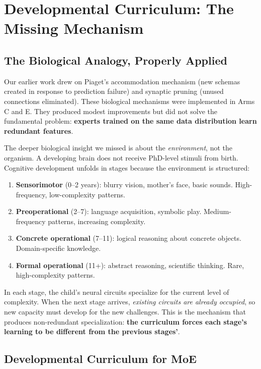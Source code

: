\documentclass{article}
\begin{document}
\section{Developmental Curriculum: The Missing Mechanism}

\subsection{The Biological Analogy, Properly Applied}

Our earlier work drew on Piaget's accommodation mechanism (new schemas created in response to prediction failure) and synaptic pruning (unused connections eliminated). These biological mechanisms were implemented in Arms C and E. They produced modest improvements but did not solve the fundamental problem: \textbf{experts trained on the same data distribution learn redundant features}.

The deeper biological insight we missed is about the \emph{environment}, not the organism. A developing brain does not receive PhD-level stimuli from birth. Cognitive development unfolds in stages because the environment is structured:

\begin{enumerate}
    \item \textbf{Sensorimotor} (0--2 years): blurry vision, mother's face, basic sounds. High-frequency, low-complexity patterns.
    \item \textbf{Preoperational} (2--7): language acquisition, symbolic play. Medium-frequency patterns, increasing complexity.
    \item \textbf{Concrete operational} (7--11): logical reasoning about concrete objects. Domain-specific knowledge.
    \item \textbf{Formal operational} (11+): abstract reasoning, scientific thinking. Rare, high-complexity patterns.
\end{enumerate}

In each stage, the child's neural circuits specialize for the current level of complexity. When the next stage arrives, \emph{existing circuits are already occupied}, so new capacity must develop for the new challenges. This is the mechanism that produces non-redundant specialization: \textbf{the curriculum forces each stage's learning to be different from the previous stages'}.

\subsection{Developmental Curriculum for MoE}
\end{document}
